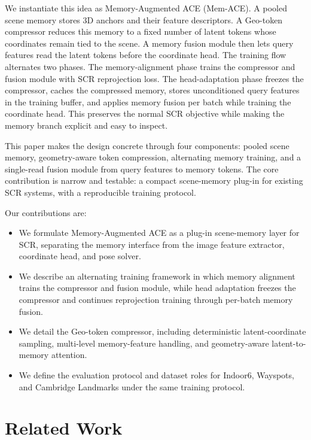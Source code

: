 \documentclass[letterpaper]{article} %
\newcommand{\method}{Memory-Augmented ACE}
\newcommand{\shortmethod}{Mem-ACE}
\newcommand{\geocomp}{Geo-token compressor}
\begin{document}
We instantiate this idea as \method{} (\shortmethod{}). A pooled scene memory stores 3D anchors and their feature descriptors. A \geocomp{} reduces this memory to a fixed number of latent tokens whose coordinates remain tied to the scene. A memory fusion module then lets query features read the latent tokens before the coordinate head. The training flow alternates two phases. The memory-alignment phase trains the compressor and fusion module with SCR reprojection loss. The head-adaptation phase freezes the compressor, caches the compressed memory, stores unconditioned query features in the training buffer, and applies memory fusion per batch while training the coordinate head. This preserves the normal SCR objective while making the memory branch explicit and easy to inspect.

This paper makes the design concrete through four components: pooled scene memory, geometry-aware token compression, alternating memory training, and a single-read fusion module from query features to memory tokens. The core contribution is narrow and testable: a compact scene-memory plug-in for existing SCR systems, with a reproducible training protocol.

Our contributions are:
\begin{itemize}
    \item We formulate \method{} as a plug-in scene-memory layer for SCR, separating the memory interface from the image feature extractor, coordinate head, and pose solver.
    \item We describe an alternating training framework in which memory alignment trains the compressor and fusion module, while head adaptation freezes the compressor and continues reprojection training through per-batch memory fusion.
    \item We detail the \geocomp{}, including deterministic latent-coordinate sampling, multi-level memory-feature handling, and geometry-aware latent-to-memory attention.
    \item We define the evaluation protocol and dataset roles for Indoor6, Wayspots, and Cambridge Landmarks under the same training protocol.
\end{itemize}


\section{Related Work}
\end{document}
